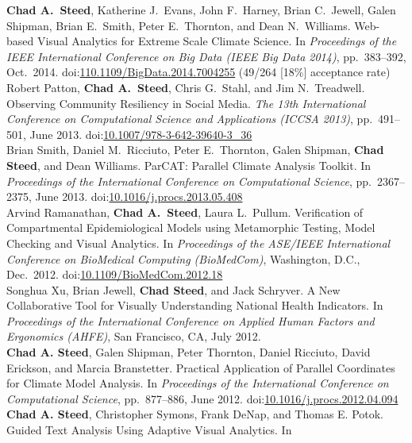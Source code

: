 \documentclass[11pt, letterpaper]{article}
\newcommand{\years}[1]{\marginnote{\scriptsize #1}}
\begin{document}
\begin{sloppypar}
\years{2014}\textbf{Chad A.\ Steed}, Katherine J.\ Evans, John F.\ Harney,
Brian C.\ Jewell, Galen Shipman, Brian E.\ Smith, Peter E.\ Thornton, and
Dean N.\ Williams. Web-based Visual Analytics for Extreme Scale Climate Science.
In \emph{Proceedings of the IEEE International Conference on Big Data (IEEE Big Data 2014)},
pp.\ 383--392, Oct.\ 2014.
doi:\href{http://dx.doi.org/10.1109/BigData.2014.7004255}{110.1109/BigData.2014.7004255} (49/264 [18\%] acceptance rate)\\
\years{2013}Robert Patton, \textbf{Chad A.\ Steed}, Chris G.\ Stahl, and
Jim N.\ Treadwell. Observing Community Resiliency in Social Media. \emph{The 13th
International Conference on Computational Science and Applications (ICCSA 2013)},
pp.\ 491--501, June 2013.
doi:\href{http://dx.doi.org/10.1007/978-3-642-39640-3\_36}{10.1007/978-3-642-39640-3\_36} \\
\years{2013}Brian Smith, Daniel M.\ Ricciuto, Peter E.\ Thornton, Galen Shipman,
\textbf{Chad Steed}, and Dean Williams. ParCAT: Parallel Climate Analysis Toolkit.
In \emph{Proceedings of the International Conference on Computational
Science}, pp.\ 2367--2375, June 2013.
doi:\href{http://dx.doi.org/10.1016/j.procs.2013.05.408}{10.1016/j.procs.2013.05.408} \\
\years{2012}Arvind Ramanathan, \textbf{Chad A.\ Steed}, Laura L.\ Pullum.
Verification of Compartmental Epidemiological Models using Metamorphic Testing,
Model Checking and Visual Analytics. In \emph{Proceedings of the ASE/IEEE International
Conference on BioMedical Computing (BioMedCom)}, Washington, D.C., Dec.\ 2012.
doi:\href{http://dx.doi.org/10.1109/BioMedCom.2012.18}{10.1109/BioMedCom.2012.18} \\
\years{2012}Songhua Xu, Brian Jewell, \textbf{Chad Steed},
and Jack Schryver. A New Collaborative Tool for Visually Understanding
National Health Indicators. In \emph{Proceedings of the International
Conference on Applied Human Factors and Ergonomics (AHFE)}, San Francisco, CA,
July 2012.\\
\years{2012}\textbf{Chad A. Steed}, Galen Shipman, Peter Thornton, Daniel Ricciuto,
David Erickson, and Marcia Branstetter.  Practical Application of Parallel Coordinates for
Climate Model Analysis. In \emph{Proceedings of the International Conference on Computational
Science}, pp.\ 877--886, June 2012.
doi:\href{http://dx.doi.org/10.1016/j.procs.2012.04.094}
{10.1016/j.procs.2012.04.094} \\
\years{2012}\textbf{Chad A. Steed}, Christopher Symons, Frank DeNap, and
Thomas E. Potok. Guided Text Analysis Using Adaptive Visual Analytics. In

\end{sloppypar}
\end{document}
